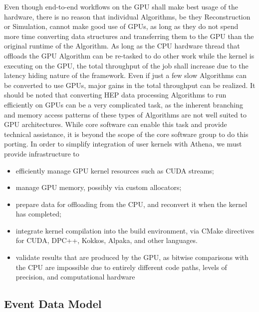 Even though end-to-end workflows on the GPU shall make best usage of the hardware, there is no reason that individual Algorithms, be they Reconstruction or Simulation, cannot make good use of GPUs, as long as they do not spend more time converting data structures and transferring them to the GPU than the
original runtime of the Algorithm. As long as the CPU hardware thread that offloads the GPU Algorithm can be re-tasked to do other work while the kernel is executing on the GPU, the total throughput of the job shall increase due to the latency hiding nature of the framework. Even if just a few slow Algorithms can be converted to use GPUs, major gains in the total throughput can be realized. It should be noted that converting HEP data processing Algorithms to run efficiently on GPUs can be a very complicated task, as the inherent branching and memory access patterns of these types of Algorithms are not well suited to GPU architectures. While core software can enable this task and provide technical assistance, it is beyond the scope of the core software group to do this porting. 
In order to simplify integration of user kernels with Athena, we must provide infrastructure to 
\begin{itemize}
    \item efficiently manage GPU kernel resources such as CUDA streams;
    \item manage GPU memory, possibly via custom allocators;
    \item prepare data for offloading from the CPU, and reconvert it when the kernel has completed;
    \item integrate kernel compilation into the build environment, via CMake directives for CUDA, DPC++, Kokkos, Alpaka, and other languages.
    \item validate results that are produced by the GPU, as bitwise comparisons with the CPU are impossible due to entirely different code paths, levels of precision, and computational hardware
\end{itemize}

\subsection{Event Data Model}

